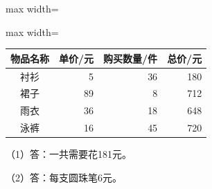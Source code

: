
\begingroup\color{answerred}\par\endgroup
{}
\begingroup\color{answerred}\par\smallskip\noindent\begin{adjustbox}{max width=\linewidth}\begin{adjustbox}{max width=\linewidth}\begin{tabular}{c|rrr}
\hline
物品名称&单价/元&购买数量/件&总价/元\\\hline
衬衫&5&36&180\\
裙子&89&8&712\\
雨衣&36&18&648\\
泳裤&16&45&720\\\hline
\end{tabular}\end{adjustbox}\end{adjustbox}\par\smallskip\par\endgroup
{}
\begingroup\color{answerred}\noindent（1）答：一共需要花181元。\par
\noindent（2）答：每支圆珠笔6元。\par\par\endgroup
